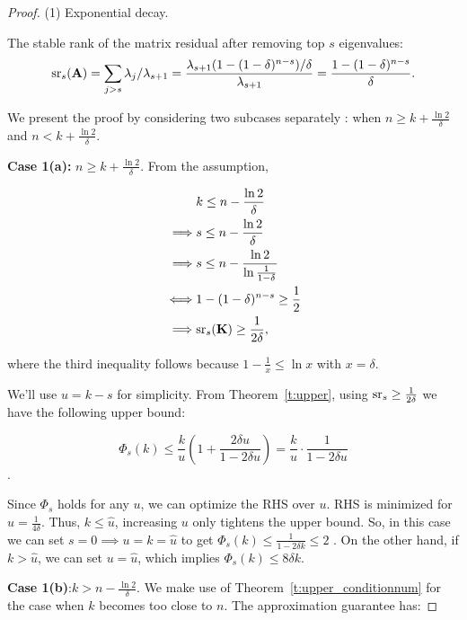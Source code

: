 \documentclass{article}
\begin{document}
\begin{proof}
	(1) Exponential decay.
	
	
	 The stable rank of the matrix residual after removing top $s$ eigenvalues:
	\[ {\mathrm{sr}}_s(\mathbf A) = \sum_{j>s} \lambda_j/\lambda_{s+1} =  \frac{\lambda_{s+1}(1-(1-\delta)^{n-s})/\delta }{\lambda_{s+1}} =  \frac{1-(1-\delta)^{n-s}}{\delta}.
	\]
	
		We present the proof by considering two subcases separately : when $n \geq k +  \frac{\ln 2}{\delta}$ and $n < k+  \frac{\ln 2}{\delta}$.
		
	\textbf{Case 1(a):}  $n \geq k +  \frac{\ln 2}{\delta}$. From the assumption,
	
	\begin{align*}
	& k \leq n -  \frac{\ln 2}{\delta}  \\
	\implies & s \leq n - \frac{\ln 2}{\delta}  \\
	\implies  & s \leq n - \frac{\ln 2}{\ln \frac{1}{1-\delta}} \\
	\iff & 1 - (1-\delta)^{n-s} \geq \frac{1}{2}   \\
	\implies & {\mathrm{sr}}_s(\mathbf K) \geq \frac{1}{2\delta},
	\end{align*}
	
	where the third inequality follows because $1-\frac{1}{x} \leq \ln x$ with $x = \delta$. 
	
	We'll use $u=k-s$ for simplicity. From Theorem~\ref{t:upper}, using ${\mathrm{sr}}_s \geq \frac{1}{2\delta}$ we have the following upper bound:
	
	\[ \Phi_s(k) \leq \frac{k}{u} \left(1+ \frac{2\delta u}{1 - 2\delta u}\right)  = \frac{k}{u}\cdot \frac{1}{1-2\delta u}\].
	
	Since $\Phi_s$ holds for any $u$, we can optimize the RHS over $u$. RHS is minimized for $\hat{u}=\frac{1}{4\delta}$. Thus,  $k  \leq \hat{u}$, increasing $u$ only tightens the upper bound. So, in this case we can set $s=0 \implies u = k = \hat{u}$ to get $\Phi_s(k) \leq \frac{1}{1- 2\delta k}\leq 2$ . On the other hand, if $k > \hat{u}$, we can set $u=\hat{u}$, which implies $\Phi_s(k) \leq 8\delta k$. 
	
	\bigskip
	\textbf{Case 1(b)}:$k > n - \frac{\ln 2}{\delta}$. We make use of Theorem~\ref{t:upper_conditionnum} for the case when $k$ becomes too close to $n$. The approximation guarantee has: 
	

\end{proof}
\end{document}
